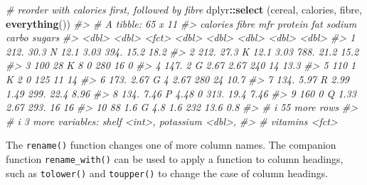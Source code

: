 \documentclass[
]{book}
\newenvironment{Shaded}{\begin{snugshade}}{\end{snugshade}}
\newcommand{\CommentTok}[1]{\textcolor[rgb]{0.56,0.35,0.01}{\textit{#1}}}
\newcommand{\FunctionTok}[1]{\textcolor[rgb]{0.13,0.29,0.53}{\textbf{#1}}}
\newcommand{\NormalTok}[1]{#1}
\newcommand{\SpecialCharTok}[1]{\textcolor[rgb]{0.81,0.36,0.00}{\textbf{#1}}}
\begin{document}
\begin{Shaded}
\begin{Highlighting}[]
                   \CommentTok{\# reorder with calories first, followed by fibre}
\NormalTok{dplyr}\SpecialCharTok{::}\FunctionTok{select}\NormalTok{ (cereal, calories, fibre, }\FunctionTok{everything}\NormalTok{()) }
\CommentTok{\#\textgreater{} \# A tibble: 65 x 11}
\CommentTok{\#\textgreater{}    calories fibre mfr   protein   fat sodium carbo sugars}
\CommentTok{\#\textgreater{}       \textless{}dbl\textgreater{} \textless{}dbl\textgreater{} \textless{}fct\textgreater{}   \textless{}dbl\textgreater{} \textless{}dbl\textgreater{}  \textless{}dbl\textgreater{} \textless{}dbl\textgreater{}  \textless{}dbl\textgreater{}}
\CommentTok{\#\textgreater{}  1     212. 30.3  N       12.1   3.03   394.  15.2  18.2 }
\CommentTok{\#\textgreater{}  2     212. 27.3  K       12.1   3.03   788.  21.2  15.2 }
\CommentTok{\#\textgreater{}  3     100  28    K        8     0      280   16     0   }
\CommentTok{\#\textgreater{}  4     147.  2    G        2.67  2.67   240   14    13.3 }
\CommentTok{\#\textgreater{}  5     110   1    K        2     0      125   11    14   }
\CommentTok{\#\textgreater{}  6     173.  2.67 G        4     2.67   280   24    10.7 }
\CommentTok{\#\textgreater{}  7     134.  5.97 R        2.99  1.49   299.  22.4   8.96}
\CommentTok{\#\textgreater{}  8     134.  7.46 P        4.48  0      313.  19.4   7.46}
\CommentTok{\#\textgreater{}  9     160   0    Q        1.33  2.67   293.  16    16   }
\CommentTok{\#\textgreater{} 10      88   1.6  G        4.8   1.6    232   13.6   0.8 }
\CommentTok{\#\textgreater{} \# i 55 more rows}
\CommentTok{\#\textgreater{} \# i 3 more variables: shelf \textless{}int\textgreater{}, potassium \textless{}dbl\textgreater{},}
\CommentTok{\#\textgreater{} \#   vitamins \textless{}fct\textgreater{}}
\end{Highlighting}
\end{Shaded}

The \texttt{rename()} function changes one of more column names. The companion function \texttt{rename\_with()} can be used to apply a function to column headings, such as \texttt{tolower()} and \texttt{toupper()} to change the case of column headings.
\end{document}
